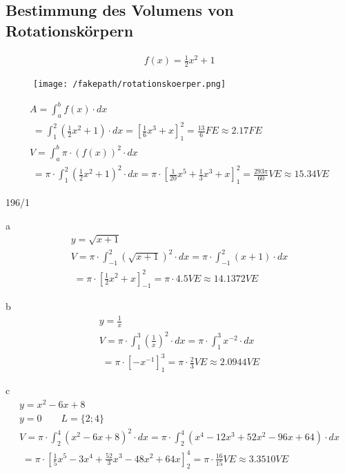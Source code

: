 \subsection{Bestimmung des Volumens von Rotationskörpern}
\begin{gather*}
  f(x) = \frac{1}{2}x^2 + 1
\end{gather*}
\begin{figure}[H]
  \centering
  \texttt{[image: /fakepath/rotationskoerper.png]}
\end{figure}
\begin{gather*}
  A = \int_a^b f(x) \cdot dx \\
  \;= \int_1^2 (\frac{1}{2}x^2 + 1) \cdot dx = \left[\frac{1}{6}x^3 + x\right]_1^2 = \frac{13}{6} FE \approx 2.17FE \\
  V = \int_a^b \pi \cdot (f(x))^2 \cdot dx \\
  \;= \pi \cdot \int_1^2 (\frac{1}{2}x^2 + 1)^2 \cdot dx = \pi \cdot \left[\frac{1}{20}x^5 + \frac{1}{3}x^3 + x\right]_1^2 = \frac{293\pi}{60}VE \approx 15.34VE
\end{gather*}
\newpage
\begin{exercise}{196/1}
  \item [a]
  \begin{gather*}
    y = \sqrt{x + 1} \\
    V = \pi \cdot \int_{-1}^2 (\sqrt{x + 1})^2 \cdot dx = \pi \cdot \int_{-1}^2 (x + 1) \cdot dx \\
    \;= \pi \cdot \left[\frac{1}{2}x^2 + x\right]_{-1}^2 = \pi \cdot 4.5VE \approx 14.1372VE
  \end{gather*}
  \item [b]
  \begin{gather*}
    y = \frac{1}{x} \\
    V = \pi \cdot \int_1^3 (\frac{1}{x})^2 \cdot dx = \pi \cdot \int_1^3 x^{-2} \cdot dx \\
    \;= \pi \cdot \left[-x^{-1}\right]_1^3 = \pi \cdot \frac{2}{3}VE \approx 2.0944VE
  \end{gather*}
  \item [c]
  \begin{gather*}
    y = x^2 - 6x + 8 \\
    y = 0 \qquad L = \{2; 4\} \\
    V = \pi \cdot \int_2^4 (x^2 - 6x + 8)^2 \cdot dx = \pi \cdot \int_2^4 (x^4 - 12x^3 + 52x^2 - 96x + 64) \cdot dx \\
    \;= \pi \cdot \left[\frac{1}{5}x^5 - 3x^4 + \frac{52}{3}x^3 - 48x^2 + 64x\right]_2^4 = \pi \cdot \frac{16}{15}VE \approx 3.3510VE
  \end{gather*}
\end{exercise}
